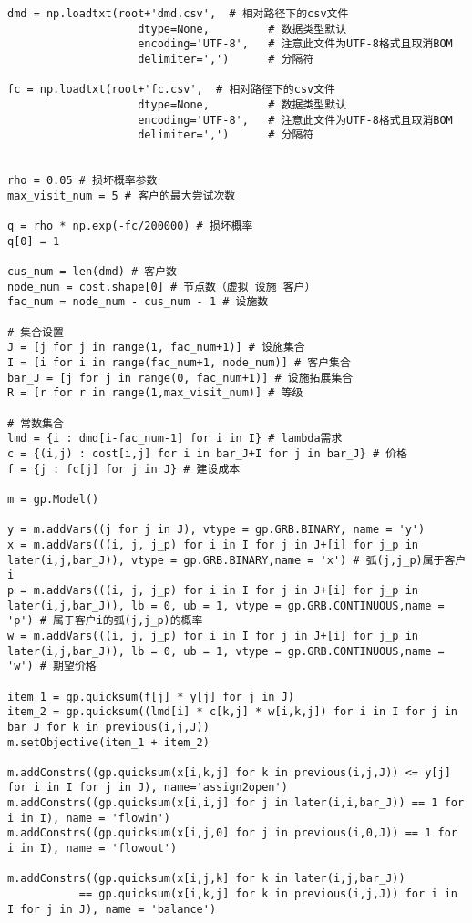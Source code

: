 \begin{lstlisting}
dmd = np.loadtxt(root+'dmd.csv',  # 相对路径下的csv文件
                    dtype=None,         # 数据类型默认
                    encoding='UTF-8',   # 注意此文件为UTF-8格式且取消BOM
                    delimiter=',')      # 分隔符

fc = np.loadtxt(root+'fc.csv',  # 相对路径下的csv文件
                    dtype=None,         # 数据类型默认
                    encoding='UTF-8',   # 注意此文件为UTF-8格式且取消BOM
                    delimiter=',')      # 分隔符

                      
rho = 0.05 # 损坏概率参数
max_visit_num = 5 # 客户的最大尝试次数

q = rho * np.exp(-fc/200000) # 损坏概率
q[0] = 1

cus_num = len(dmd) # 客户数
node_num = cost.shape[0] # 节点数（虚拟 设施 客户）
fac_num = node_num - cus_num - 1 # 设施数

# 集合设置
J = [j for j in range(1, fac_num+1)] # 设施集合
I = [i for i in range(fac_num+1, node_num)] # 客户集合
bar_J = [j for j in range(0, fac_num+1)] # 设施拓展集合
R = [r for r in range(1,max_visit_num)] # 等级

# 常数集合
lmd = {i : dmd[i-fac_num-1] for i in I} # lambda需求
c = {(i,j) : cost[i,j] for i in bar_J+I for j in bar_J} # 价格
f = {j : fc[j] for j in J} # 建设成本

m = gp.Model()

y = m.addVars((j for j in J), vtype = gp.GRB.BINARY, name = 'y')
x = m.addVars(((i, j, j_p) for i in I for j in J+[i] for j_p in later(i,j,bar_J)), vtype = gp.GRB.BINARY,name = 'x') # 弧(j,j_p)属于客户i
p = m.addVars(((i, j, j_p) for i in I for j in J+[i] for j_p in later(i,j,bar_J)), lb = 0, ub = 1, vtype = gp.GRB.CONTINUOUS,name = 'p') # 属于客户i的弧(j,j_p)的概率
w = m.addVars(((i, j, j_p) for i in I for j in J+[i] for j_p in later(i,j,bar_J)), lb = 0, ub = 1, vtype = gp.GRB.CONTINUOUS,name = 'w') # 期望价格

item_1 = gp.quicksum(f[j] * y[j] for j in J)
item_2 = gp.quicksum((lmd[i] * c[k,j] * w[i,k,j]) for i in I for j in bar_J for k in previous(i,j,J))
m.setObjective(item_1 + item_2)

m.addConstrs((gp.quicksum(x[i,k,j] for k in previous(i,j,J)) <= y[j] for i in I for j in J), name='assign2open')
m.addConstrs((gp.quicksum(x[i,i,j] for j in later(i,i,bar_J)) == 1 for i in I), name = 'flowin')
m.addConstrs((gp.quicksum(x[i,j,0] for j in previous(i,0,J)) == 1 for i in I), name = 'flowout')

m.addConstrs((gp.quicksum(x[i,j,k] for k in later(i,j,bar_J)) 
           == gp.quicksum(x[i,k,j] for k in previous(i,j,J)) for i in I for j in J), name = 'balance')


\end{lstlisting}
